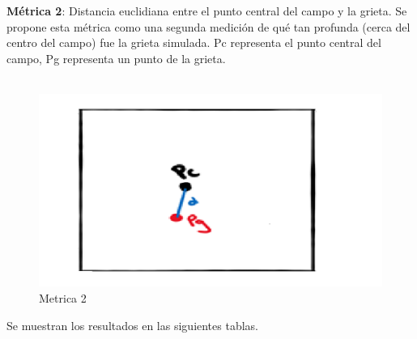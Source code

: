 \documentclass{article}
\begin{document}
\textbf{Métrica 2}: Distancia euclidiana entre el punto central del campo y la grieta. Se propone esta métrica como una segunda medición de qué tan profunda (cerca del centro del campo) fue la grieta simulada.  Pc representa el punto central del campo, Pg representa un punto de la grieta.\\
\\
\newpage
\begin{figure}[h]
	\centering
	\includegraphics[width=0.7\linewidth]{imagen2}
	\caption{Metrica 2}
	\label{fig:imagen2}
\end{figure}



Se muestran los resultados en las siguientes tablas.\\
\end{document}
